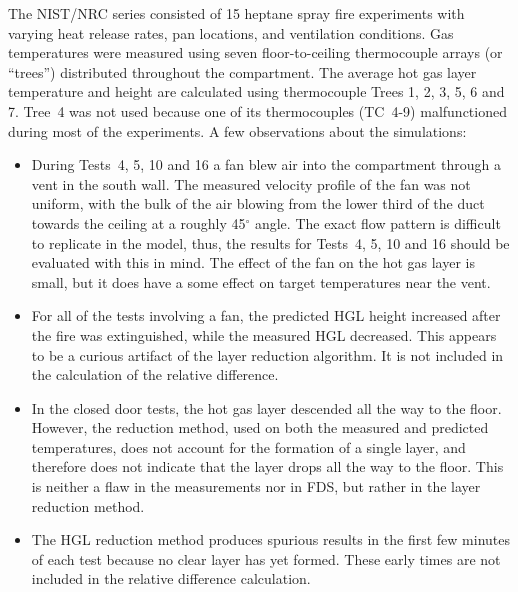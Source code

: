 The NIST/NRC series consisted of 15 heptane spray fire experiments with varying heat release rates, pan locations, and ventilation conditions.
Gas temperatures were measured using seven floor-to-ceiling thermocouple arrays (or ``trees'') distributed throughout the compartment.  The average hot gas layer temperature and height are calculated using thermocouple Trees 1, 2, 3, 5, 6 and 7. Tree~4 was not used because one of its thermocouples (TC~4-9) malfunctioned during most of the experiments. A few observations about the simulations:
\begin{itemize}
\item During Tests~4, 5, 10 and 16 a fan blew air into the compartment through a vent in the south wall. The measured velocity profile of the fan was not uniform, with the bulk of the air blowing from the lower third of the duct towards the ceiling at a roughly 45$^\circ$ angle.  The exact flow pattern is difficult to replicate in the model, thus, the results for Tests~4, 5, 10 and 16 should be evaluated with this in mind. The effect of the fan on the hot gas layer is small, but it does have a some effect on target temperatures near the vent.
\item For all of the tests involving a fan, the predicted HGL height increased after the fire was extinguished, while the measured HGL decreased.  This appears to be a curious artifact of the layer reduction algorithm. It is not included in the calculation of the relative difference.
\item In the closed door tests, the hot gas layer descended all the way to the floor. However, the reduction method, used on both the measured and predicted temperatures, does not account for the formation of a single layer, and therefore does not indicate that the layer drops all the way to the floor. This is neither a flaw in the measurements nor in FDS, but rather in the layer reduction method.
\item The HGL reduction method produces spurious results in the first few minutes of each test because no clear layer has yet formed. These early times are not included in the relative difference calculation.
\end{itemize}

\newpage


